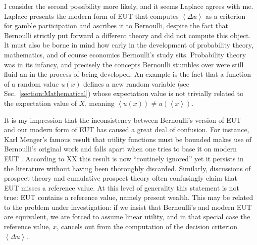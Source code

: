 \documentclass[dvips,draft]{ectaart}
\newcommand{\ave}[1]{\left\langle#1 \right\rangle}
\newcommand{\secref}[1]{Sec.~\ref{section:#1}}
\newcommand{\Du}{\Delta u}
\begin{document}
I consider the second possibility more likely, and it seems Laplace agrees with me. Laplace presents the modern form of EUT that computes $\ave{\Du}$ as a criterion for gamble participation and ascribes it to Bernoulli, despite the fact that Bernoulli strictly put forward a different theory and did not compute this object. It must also be borne in mind how early in the development of probability theory, mathematics, and of course economics Bernoulli's study sits. Probability theory was in its infancy, and precisely the concepts Bernoulli stumbles over were still fluid an in the process of being developed. An example is the fact that a function of a random value $u(x)$ defines a new random variable (see \secref{Mathematical}) whose expectation value is not trivially related to the expectation value of $X$, meaning $\ave{u(x)}\neq u(\ave{x})$.

It is my impression that the inconsistency between Bernoulli's version of EUT and our modern form of EUT has caused a great deal of confusion. For instance, Karl Menger's famous result that utility functions must be bounded \cite{Menger1934} makes use of Bernoulli's original work and falls apart when one tries to base it on modern EUT \cite{Peters2011c,PetersGell-Mann2016}. According to XX this result is now ``routinely ignored'' yet it persists in the literature without having been thoroughly discarded. Similarly, discussions of prospect theory and cumulative prospect theory often confusingly claim that EUT misses a reference value. At this level of generality this statement is not true: EUT contains a reference value, namely present wealth. This may be related to the problem under investigation: if we insist that Bernoulli's and modern EUT are equivalent, we are forced to assume linear utility, and in that special case the reference value, $x$, cancels out from the computation of the decision criterion $\ave{\Du}$.


\end{document}
